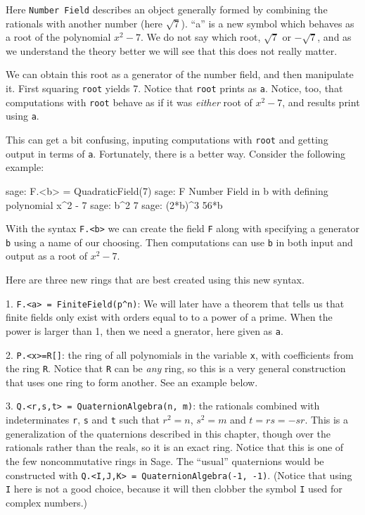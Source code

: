 %
Here \verb?Number Field? describes an object generally formed by combining the rationals with another number (here $\sqrt{7}$).  ``a'' is a new symbol which behaves as a root of the polynomial $x^2-7$.  We do not say which root, $\sqrt{7}$ or $-\sqrt{7}$, and as we understand the theory better we will see that this does not really matter.\par
%
We can obtain this root as a generator of the number field, and then manipulate it.  First squaring \verb?root? yields 7.  Notice that \verb?root? prints as \verb?a?.  Notice, too, that computations with \verb?root? behave as if it was \emph{either} root of $x^2-7$, and results print using \verb?a?.\par
%
This can get a bit confusing, inputing computations with \verb?root? and getting output in terms of \verb?a?.  Fortunately, there is a better way.  Consider the following example:
%
\begin{sageexample}
sage: F.<b> = QuadraticField(7)
sage: F
Number Field in b with defining polynomial x^2 - 7
sage: b^2
7
sage: (2*b)^3
56*b
\end{sageexample}
%
With the syntax \verb?F.<b>? we can create the field \verb?F? along with specifying a generator \verb?b? using a name of our choosing.  Then computations can use \verb?b? in both input and output as a root of $x^2-7$.\par
%
Here are three new rings that are best created using this new syntax.\par
%
1. \verb?F.<a> = FiniteField(p^n)?: We will later have a theorem that tells us that finite fields only exist with orders equal to to a power of a prime.  When the power is larger than 1, then we need a gnerator, here given as \verb?a?.\par
%
2. \verb?P.<x>=R[]?: the ring of all polynomials in the variable \verb?x?, with coefficients from the ring \verb?R?.  Notice that \verb?R? can be \emph{any} ring, so this is a very general construction that uses one ring to form another.  See an example below.\par
%
3. \verb?Q.<r,s,t> = QuaternionAlgebra(n, m)?: the rationals combined with indeterminates \verb?r?, \verb?s? and \verb?t? such that $r^2=n$, $s^2=m$ and $t = rs = -sr$.  This is a generalization of the quaternions described in this chapter, though over the rationals rather than the reals, so it is an exact ring.  Notice that this is one of the few noncommutative rings in Sage.  The ``usual'' quaternions would be constructed with \verb?Q.<I,J,K> = QuaternionAlgebra(-1, -1)?.  (Notice that using \verb?I? here is not a good choice, because it will then clobber the symbol \verb?I? used for complex numbers.)
